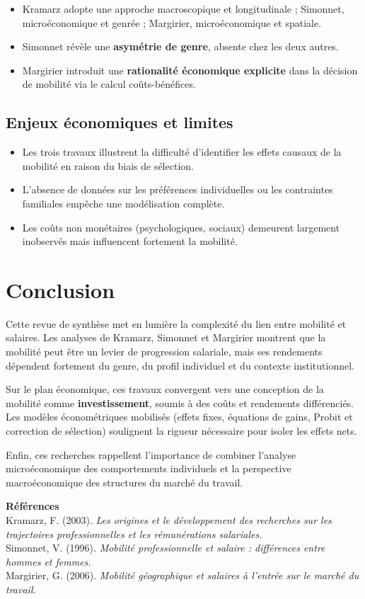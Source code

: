 \documentclass[12pt,a4paper]{article}
\begin{document}
\begin{itemize}
    \item Kramarz adopte une approche macroscopique et longitudinale ; Simonnet, microéconomique et genrée ; Margirier, microéconomique et spatiale.
    \item Simonnet révèle une \textbf{asymétrie de genre}, absente chez les deux autres.
    \item Margirier introduit une \textbf{rationalité économique explicite} dans la décision de mobilité via le calcul coûts-bénéfices.
\end{itemize}

\subsection{Enjeux économiques et limites}

\begin{itemize}
    \item Les trois travaux illustrent la difficulté d’identifier les effets causaux de la mobilité en raison du biais de sélection.
    \item L’absence de données sur les préférences individuelles ou les contraintes familiales empêche une modélisation complète.
    \item Les coûts non monétaires (psychologiques, sociaux) demeurent largement inobservés mais influencent fortement la mobilité.
\end{itemize}

\section*{Conclusion}

Cette revue de synthèse met en lumière la complexité du lien entre mobilité et salaires.  
Les analyses de Kramarz, Simonnet et Margirier montrent que la mobilité peut être un levier de progression salariale, mais ses rendements dépendent fortement du genre, du profil individuel et du contexte institutionnel.

Sur le plan économique, ces travaux convergent vers une conception de la mobilité comme \textbf{investissement}, soumis à des coûts et rendements différenciés.  
Les modèles économétriques mobilisés (effets fixes, équations de gains, Probit et correction de sélection) soulignent la rigueur nécessaire pour isoler les effets nets.  

Enfin, ces recherches rappellent l’importance de combiner l’analyse microéconomique des comportements individuels et la perspective macroéconomique des structures du marché du travail.

\vspace{1em}
\noindent\textbf{Références} \\
Kramarz, F. (2003). \textit{Les origines et le développement des recherches sur les trajectoires professionnelles et les rémunérations salariales.} \\
Simonnet, V. (1996). \textit{Mobilité professionnelle et salaire : différences entre hommes et femmes.} \\
Margirier, G. (2006). \textit{Mobilité géographique et salaires à l’entrée sur le marché du travail.}
\end{document}
